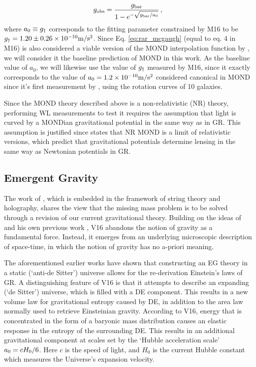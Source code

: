 \documentclass[usenatbib]{mnras}
\newcommand{\mpss}{ {\rm m/s^2} }
\newcommand*{\E}[1]{\times 10^{#1}}
\newcommand{\un}[1]{_{\rm #1}}
\begin{document}
\begin{equation}\label{eq:rar_mcgaugh}
	g\un{obs} = \frac{g\un{bar}}{1 - e^{-\sqrt{g\un{bar}/a_0}}} \, ,
\end{equation}
where $a_0 \equiv g\un{\dagger}$ corresponds to the fitting parameter constrained by M16 to be $g\un{\dagger}=1.20\pm0.26\E{-10} \mpss$. Since Eq. \ref{eq:rar_mcgaugh} (equal to eq. 4 in M16) is also considered a viable version of the MOND interpolation function by \cite{milgrom2008}, we will consider it the baseline prediction of MOND in this work. As the baseline value of $a_0$, we will likewise use the value of $g\un{\dagger}$ measured by M16, since it exactly corresponds to the value of $a_0=1.2\E{-10} \mpss$ considered canonical in MOND since it's first measurement by \cite{begeman1991}, using the rotation curves of 10 galaxies.

Since the MOND theory described above is a non-relativistic (NR) theory, performing WL measurements to test it requires the assumption that light is curved by a MONDian gravitational potential in the same way as in GR. This assumption is justified since \citet[][while testing the MOND paradigm using GGL data from the Canada-France-Hawaii Telescope survey]{milgrom2013} states that NR MOND is a limit of relativistic versions, which predict that gravitational potentials determine lensing in the same way as Newtonian potentials in GR.

\subsection{Emergent Gravity}
\label{sec:EG}

The work of \citet[][V16 hereafter]{verlinde2016}, which is embedded in the framework of string theory and holography, shares the view that the missing mass problem is to be solved through a revision of our current gravitational theory. Building on the ideas of \cite{jacobson1995,jacobson2016,padmanabhan2010,faulkner2015} and his own previous work \cite[]{verlinde2011}, V16 abandons the notion of gravity as a fundamental force. Instead, it emerges from an underlying microscopic description of space-time, in which the notion of gravity has no a-priori meaning.

The aforementioned earlier works have shown that constructing an EG theory in a static (`anti-de Sitter') universe allows for the re-derivation Einstein's laws of GR. A distinguishing feature of V16 is that it attempts to describe an expanding (`de Sitter') universe, which is filled with a DE component. This results in a new volume law for gravitational entropy caused by DE, in addition to the area law normally used to retrieve Einsteinian gravity. According to V16, energy that is concentrated in the form of a baryonic mass distribution causes an elastic response in the entropy of the surrounding DE. This results in an additional gravitational component at scales set by the `Hubble acceleration scale' $a\un{0} = c H_0/6$. Here $c$ is the speed of light, and $H_0$ is the current Hubble constant which measures the Universe's expansion velocity.
\end{document}
